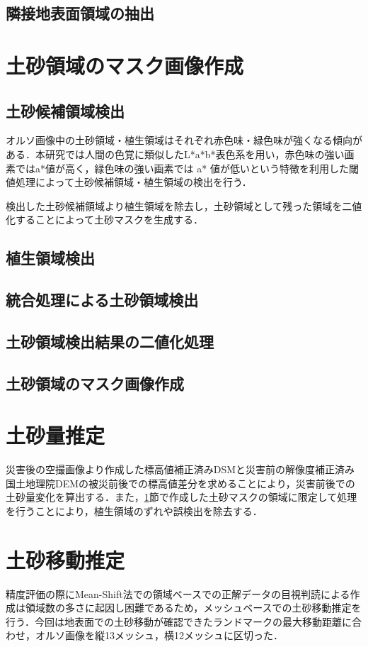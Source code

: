     \subsection{隣接地表面領域の抽出}

  
  \section{土砂領域のマスク画像作成}
    \label{土砂マスク}
    \subsection{土砂候補領域検出}
      オルソ画像中の土砂領域・植生領域はそれぞれ赤色味・緑色味が強くなる傾向がある．本研究では人間の色覚に類似したL*a*b*表色系を用い，赤色味の強い画素ではa*値が高く，緑色味の強い画素では a* 値が低いという特徴を利用した閾値処理によって土砂候補領域・植生領域の検出を行う．
      
      検出した土砂候補領域より植生領域を除去し，土砂領域として残った領域を二値化することによって土砂マスクを生成する．
  
    \subsection{植生領域検出}
      \label{植生除去}
    \subsection{統合処理による土砂領域検出}
    \subsection{土砂領域検出結果の二値化処理}
    \subsection{土砂領域のマスク画像作成}

  
  \section{土砂量推定}
    \label{土砂量推定}
    災害後の空撮画像より作成した標高値補正済みDSMと災害前の解像度補正済み国土地理院DEMの被災前後での標高値差分を求めることにより，災害前後での土砂量変化を算出する．また，\ref{土砂マスク}節で作成した土砂マスクの領域に限定して処理を行うことにより，植生領域のずれや誤検出を除去する．
  

  \section{土砂移動推定}
    \label{土砂移動推定}
    精度評価の際にMean-Shift法での領域ベースでの正解データの目視判読による作成は領域数の多さに起因し困難であるため，メッシュベースでの土砂移動推定を行う．今回は地表面での土砂移動が確認できたランドマークの最大移動距離に合わせ，オルソ画像を縦13メッシュ，横12メッシュに区切った．

